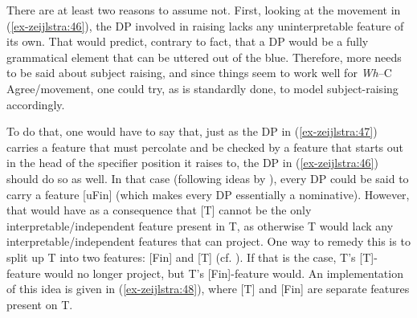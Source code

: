\documentclass[output=paper
,modfonts
,nonflat]{langsci/langscibook}
\begin{document}
There are at least two reasons to assume not. First, looking at the movement in (\ref{ex-zeijlstra:46}), the DP involved in raising lacks any uninterpretable feature of its own. That would predict, contrary to fact, that a DP would be a fully grammatical element that can be uttered out of the blue. Therefore, more needs to be said about subject raising, and since things seem to work well for \textit{Wh}–C Agree\slash movement, one could try, as is standardly done, to model subject-raising accordingly.

To do that, one would have to say that, just as the DP in (\ref{ex-zeijlstra:47}) carries a feature that must percolate and be checked by a feature that starts out in the head of the specifier position it raises to, the DP in (\ref{ex-zeijlstra:46}) should do so as well. In that case (following ideas by \citealt{Pesetsky_Torrego2004, Pesetsky_Torrego2007}), every DP could be said to carry a feature [uFin] (which makes every DP essentially a nominative). However, that would have as a consequence that [T] cannot be the only interpretable\slash independent feature present in T, as otherwise T would lack any interpretable\slash independent features that can project. One way to remedy this is to split up T into two features: [Fin] and [T] (cf. \citealt{Koeneman_Zeijlstra2017}). If that is the case, T’s [T]-feature would no longer project, but T’s [Fin]-feature would. An implementation of this idea is given in (\ref{ex-zeijlstra:48}), where [T] and [Fin] are separate features present on T.

	\begin{exe}
		\ex\label{ex-zeijlstra:48}
	\end{exe}
\end{document}
